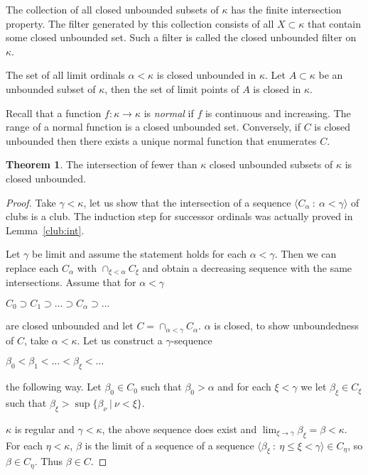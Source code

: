 \documentclass[8pt]{article}
\theoremstyle{definition}
\theoremstyle{definition}
\newtheorem{theorem}{Theorem}[section]
\theoremstyle{definition}
\theoremstyle{definition}
\theoremstyle{definition}
\theoremstyle{definition}
\theoremstyle{definition}
\theoremstyle{definition}
\theoremstyle{definition}
\theoremstyle{definition}
\theoremstyle{definition}
\theoremstyle{definition}
\theoremstyle{definition}
\theoremstyle{definition}
\theoremstyle{question}
\begin{document}
The collection of all closed unbounded subsets of $\kappa$ has the finite intersection property.
The filter generated by this collection consists of all $X \subset \kappa$ that contain some closed unbounded set.
Such a filter is called the closed unbounded filter on $\kappa$.

The set of all limit ordinals $\alpha < \kappa$ is closed unbounded in $\kappa$. 
Let $A \subset \kappa$ be an unbounded subset of $\kappa$, then the set of limit points of $A$ is closed in $\kappa$.

Recall that a function $f : \kappa \to \kappa$ is \emph{normal} if $f$ is continuous and increasing.
The range of a normal function is a closed unbounded set. Conversely, if $C$ is closed unbounded
then there exists a unique normal function that enumerates $C$.

\begin{theorem}
The intersection of fewer than $\kappa$ closed unbounded subsets of $\kappa$ is closed unbounded.
\end{theorem}

\begin{proof}
  Take $\gamma < \kappa$, let us show that the intersection of a sequence 
  $\langle C_{\alpha} \: : \: \alpha < \gamma \rangle$ of clubs is a club.
  The induction step for successor ordinals was actually proved in Lemma~\ref{club:int}.

  Let $\gamma$ be limit and assume the statement holds for each $\alpha < \gamma$.
  Then we can replace each $C_{\alpha}$ with $\cap_{\xi < \alpha} C_{\xi}$ and obtain a decreasing sequence with the same
  intersections. Assume that for $\alpha < \gamma$
  \begin{center}
    $C_0 \supset C_1 \supset \ldots \supset C_{\alpha} \supset \dots $
  \end{center}
  are closed unbounded and let $C = \cap_{\alpha < \gamma} C_{\alpha}$.
  $\alpha$ is closed, to show unboundedness of $C$, take $\alpha < \kappa$. Let us construct a $\gamma$-sequence
  \begin{center}
    $\beta_0 < \beta_1 < \ldots < \beta_{\xi} < \ldots$
  \end{center}
  the following way. Let $\beta_0 \in C_0$ such that $\beta_0 > \alpha$ and for each 
  $\xi < \gamma$ we let $\beta_{\xi} \in C_{\xi}$ such that $\beta_{\xi} > \sup \{ \beta_{\nu} \: | \: \nu < \xi \}$.

  $\kappa$ is regular and $\gamma < \kappa$, the above sequence does exist and 
  $\lim_{\xi \to \gamma} \beta_{\xi} = \beta < \kappa$. For each $\eta < \kappa$, $\beta$ is the limit 
  of a sequence of a sequence $\langle \beta_{\xi} \: : \: \eta \leq \xi < \gamma \rangle \in C_{\eta}$, so $\beta \in C_{\eta}$.
  Thus $\beta \in C$.
\end{proof} 
\end{document}
